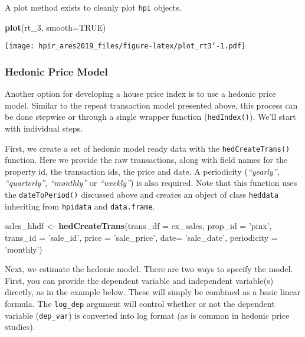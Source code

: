 \documentclass[]{article}
\newenvironment{Shaded}{\begin{snugshade}}{\end{snugshade}}
\newcommand{\KeywordTok}[1]{\textcolor[rgb]{0.13,0.29,0.53}{\textbf{#1}}}
\newcommand{\DataTypeTok}[1]{\textcolor[rgb]{0.13,0.29,0.53}{#1}}
\newcommand{\DecValTok}[1]{\textcolor[rgb]{0.00,0.00,0.81}{#1}}
\newcommand{\StringTok}[1]{\textcolor[rgb]{0.31,0.60,0.02}{#1}}
\newcommand{\OtherTok}[1]{\textcolor[rgb]{0.56,0.35,0.01}{#1}}
\newcommand{\NormalTok}[1]{#1}
\begin{document}
A plot method exists to cleanly plot \texttt{hpi} objects.

\begin{Shaded}
\begin{Highlighting}[]
  \KeywordTok{plot}\NormalTok{(rt_}\DecValTok{3}\NormalTok{, }\DataTypeTok{smooth=}\OtherTok{TRUE}\NormalTok{)}
\end{Highlighting}
\end{Shaded}

\texttt{[image: hpir\_ares2019\_files/figure-latex/plot\_rt3`-1.pdf]}

\subsubsection{Hedonic Price Model}\label{hedonic-price-model}

Another option for developing a house price index is to use a hedonic
price model. Similar to the repeat transaction model presented above,
this process can be done stepwise or through a single wrapper function
(\texttt{hedIndex()}). We'll start with individual steps.

First, we create a set of hedonic model ready data with the
\texttt{hedCreateTrans()} function. Here we provide the raw
transactions, along with field names for the property id, the
transaction ids, the price and date. A periodicity (\emph{``yearly''},
\emph{``quarterly''}, \emph{``monthly''} or \emph{``weekly''}) is also
required. Note that this function uses the \texttt{dateToPeriod()}
discussed above and creates an object of class \texttt{heddata}
inheriting from \texttt{hpidata} and \texttt{data.frame}.

\begin{Shaded}
\begin{Highlighting}[]
\NormalTok{  sales_hhdf <-}\StringTok{ }\KeywordTok{hedCreateTrans}\NormalTok{(}\DataTypeTok{trans_df =}\NormalTok{ ex_sales,}
                               \DataTypeTok{prop_id =} \StringTok{'pinx'}\NormalTok{,}
                               \DataTypeTok{trans_id =} \StringTok{'sale_id'}\NormalTok{,}
                               \DataTypeTok{price =} \StringTok{'sale_price'}\NormalTok{,}
                               \DataTypeTok{date=} \StringTok{'sale_date'}\NormalTok{,}
                               \DataTypeTok{periodicity =} \StringTok{'monthly'}\NormalTok{)}
\end{Highlighting}
\end{Shaded}

Next, we estimate the hedonic model. There are two ways to specify the
model. First, you can provide the dependent variable and independent
variable(s) directly, as in the example below. These will simply be
combined as a basic linear formula. The \texttt{log\_dep} argument will
control whether or not the dependent variable (\texttt{dep\_var}) is
converted into log format (as is common in hedonic price studies).
\end{document}
